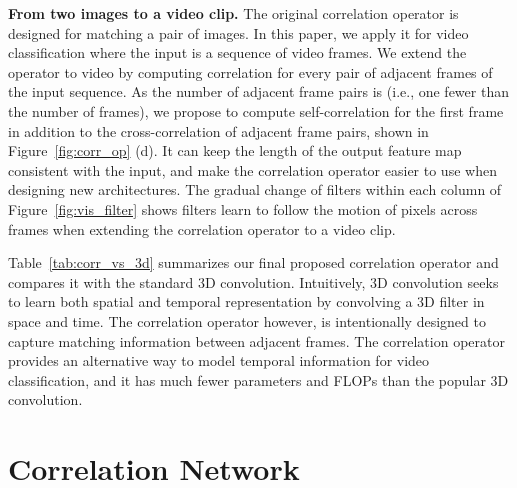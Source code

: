 \documentclass[10pt,twocolumn,letterpaper]{article}
\begin{document}
\noindent\textbf{From two images to a video clip.} The original correlation operator is designed for matching a pair of images. In this paper, we apply it for video classification where the input is a sequence of  video frames. We extend the operator to video by computing correlation for every pair of adjacent frames of the input sequence. As the number of adjacent frame pairs is  (i.e., one fewer than the number of frames), we propose to compute self-correlation for the first frame in addition to the cross-correlation of adjacent frame pairs, shown in Figure~\ref{fig:corr_op} (d). It can keep the length  of the output feature map consistent with the input, and make the correlation operator easier to use when designing new architectures. The gradual change of filters within each column of Figure~\ref{fig:vis_filter} shows filters learn to follow the motion of pixels across frames when extending the correlation operator to a video clip.

Table~\ref{tab:corr_vs_3d} summarizes our final proposed correlation operator and compares it with the standard 3D convolution. Intuitively, 3D convolution seeks to learn both spatial and temporal representation by convolving a 3D filter in space and time. The correlation operator however, is intentionally designed to capture matching information between adjacent frames. The correlation operator provides an alternative way to model temporal information for video classification, and it has much fewer parameters and FLOPs than the popular 3D convolution.


 \section{Correlation Network}\label{sec:corr_net}

\newcommand{\blockt}[4]{\multirow{4}{*}{#4}}
\end{document}
